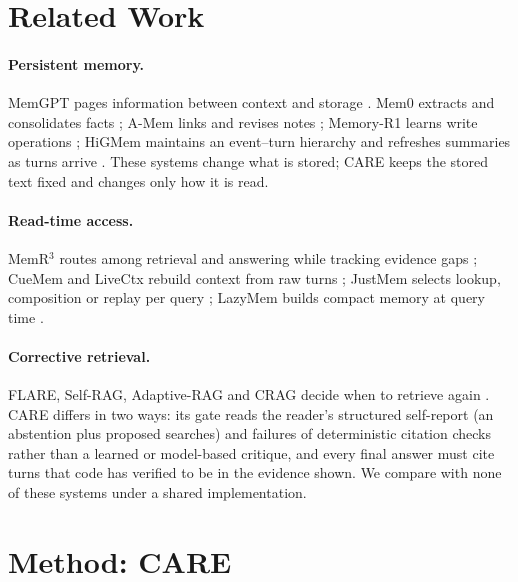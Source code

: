 \documentclass[10pt]{article}
\theoremstyle{plain}
\newcommand{\care}{\textsc{CARE}}
\begin{document}
\section{Related Work}
\label{sec:related}

\paragraph{Persistent memory.} MemGPT pages information between context and storage \citep{packer2023memgpt}.
Mem0 extracts and consolidates facts \citep{chhikara2025mem0}; A-Mem links and revises notes \citep{amem2025};
Memory-R1 learns write operations \citep{memoryr12025}; HiGMem maintains an event--turn hierarchy and refreshes
summaries as turns arrive \citep{cao2026higmem}. These systems change what is stored; \care{} keeps the stored
text fixed and changes only how it is read.

\paragraph{Read-time access.} MemR$^3$ routes among retrieval and answering while tracking evidence gaps
\citep{du2026memr3}; CueMem and LiveCtx rebuild context from raw turns \citep{wang2026cuemem,liu2026livectx};
JustMem selects lookup, composition or replay per query \citep{chen2026justmem}; LazyMem builds compact memory
at query time \citep{yu2026lazymem}.

\paragraph{Corrective retrieval.} FLARE, Self-RAG, Adaptive-RAG and CRAG decide when to retrieve again
\citep{jiang2023active,asai2023selfrag,jeong2024adaptive,yan2024crag}. \care{} differs in two ways: its gate reads
the reader's structured self-report (an abstention plus proposed searches) and failures of deterministic citation checks
rather than a learned or model-based critique, and every final answer must cite turns that code has verified to be in the
evidence shown. We compare with none of these systems under a shared implementation.

\section{Method: \care{}}
\label{sec:method}
\end{document}
